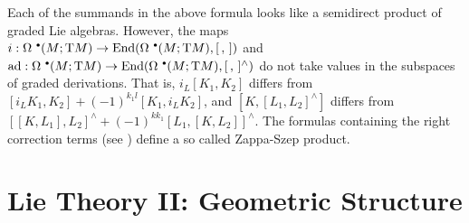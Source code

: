 \begin{rem}
    Each of the summands in the above formula looks like a semidirect product of graded Lie algebras. However, the maps $i:\Omega^{\smbullet}(M;\T M)\to \End(\Omega^{\smbullet}(M;\T M),[\,,\,])$ and $\ad:\Omega^{\smbullet}(M;\T M)\to \End(\Omega^{\smbullet}(M;\T M),[\,,\,]^{\wedge})$ do not take values in the subspaces of graded derivations. That is, $i_L[K_1,K_2]$ differs from $[i_LK_1,K_2]+(-1)^{k_1l}[K_1,i_LK_2]$, and $[K,[L_1,L_2]^{\wedge}]$ differs from $[[K,L_1],L_2]^{\wedge}+(-1)^{kk_1}[L_1,[K,L_2]]^{\wedge}$. The formulas containing the right correction terms (see \cite[8.11]{Kolar}) define a so called Zappa-Szep product.
\end{rem}













\clearpage
\section{Lie Theory II: Geometric Structure}\label{sec: Lie theory ii}

